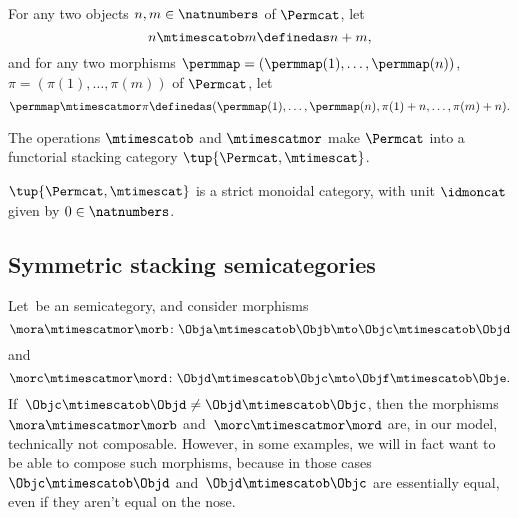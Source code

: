 \begin{definition}
    For any two objects $n, m \in \natnumbers$ of $\Permcat$, let
    \begin{equation}
        n \mtimescatob m \definedas n + m,
    \end{equation}
    and for any two morphisms $\permmap = (\permmap(1), \dots, \permmap(n))$, $\pi =  (\pi(1), \dots, \pi(m))$ of $\Permcat$, let
    \begin{equation}
        \permmap \mtimescatmor \pi \definedas (\permmap(1), \dots, \permmap(n), \pi(1) + n, \dots, \pi(m) + n).
    \end{equation}
\end{definition}

\begin{lemma}
    The operations $\mtimescatob$ and $\mtimescatmor$ make $\Permcat$ into a functorial stacking category $\tup{\Permcat, \mtimescat}$.
\end{lemma}


\begin{lemma}
    $\tup{\Permcat, \mtimescat}$ is a strict monoidal category, with unit $\idmoncat$ given by $0 \in \natnumbers$.
\end{lemma}



\subsection{Symmetric stacking semicategories}

Let~\CatC be an  semicategory, and consider morphisms
\begin{equation}
    \mora \mtimescatmor \morb \colon \Obja \mtimescatob \Objb \mto \Objc \mtimescatob \Objd
\end{equation}
and
\begin{equation}
    \morc \mtimescatmor \mord \colon \Objd \mtimescatob \Objc \mto \Objf \mtimescatob \Obje.
\end{equation}
If~$\Objc \mtimescatob \Objd \neq \Objd \mtimescatob \Objc$, then the morphisms~$\mora \mtimescatmor \morb$ and~$\morc \mtimescatmor \mord$ are, in our model, technically not composable.
However, in some examples, we will in fact want to be able to compose such morphisms, because in those cases~$\Objc \mtimescatob \Objd$ and~$\Objd \mtimescatob \Objc$ are essentially equal, even if they aren't equal on the nose.

